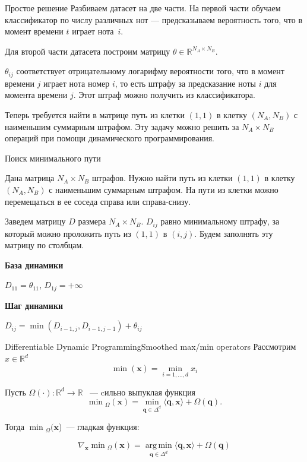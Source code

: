 \documentclass[unicode, dvipsnames]{beamer}
\DeclareMathOperator*{\argmin}{arg\,min}
\begin{document}
\begin{frame}{Простое решение}
	Разбиваем датасет на две части.
	На первой части обучаем классификатор по числу различных нот --- предсказываем вероятность того, что в момент времени $t$ играет нота~$i$.
	
	\bigskip
	Для второй части датасета построим матрицу $\theta \in \mathds{R}^{N_A \times N_B}$. 
	
	$\theta_{ij}$ соответствует отрицательному логарифму вероятности того, что в момент времени $j$ играет нота номер $i$, то есть штрафу за предсказание ноты $i$ для момента времени $j$. Этот штраф можно получить из классификатора.
	
	\bigskip
	Теперь требуется найти в матрице путь из клетки $(1, 1)$ в клетку $(N_A, N_B)$ с наименьшим суммарным штрафом. Эту задачу можно решить за $N_A \times N_B$ операций при помощи динамического программирования.
	
\end{frame}

\begin{frame}{Поиск минимального пути}

Дана матрица $N_A \times N_B$ штрафов. Нужно найти путь из клетки $(1, 1)$ в клетку $(N_A, N_B)$ с наименьшим суммарным штрафом. На пути из клетки можно перемещаться в ее соседа справа или справа-снизу.

\bigskip
Заведем матрицу $D$ размера $N_A \times N_B$. $D_{ij}$ равно минимальному штрафу, за который можно проложить путь из $(1, 1)$ в $(i, j)$. Будем заполнять эту матрицу по столбцам.

\bigskip
\textbf{База динамики}

$D_{11} = \theta_{11}$, $D_{1j} = +\infty$

\bigskip
\textbf{Шаг динамики}

$D_{ij} = \min(D_{i-1, j}, D_{i-1, j-1}) + \theta_{ij}$

\end{frame}

\begin{frame}{Differentiable Dynamic Programming}{Smoothed max/min operators}
Рассмотрим $x \in \mathbb{R}^d$
\[
	\min(\bm{x}) = \min\limits_{i=1,\ldots,d} x_i
\]	

Пусть $\Omega(\cdot): \mathbb{R}^d \to \mathbb{R}$ ~--- cильно выпуклая функция
\[
	\min{}_{\Omega}(\bm{x}) = \min\limits_{\bm{q} \in \Delta^d} \langle \bm{q}, \bm{x}\rangle + \Omega(\bm{q}).
\]

Тогда $\min{}_{\Omega}(\bm{x}$)~--- гладкая функция:

\[
	\nabla_{\bm{x}} \min{}_{\Omega}(\bm{x}) = \argmin\limits_{\bm{q} \in \Delta^d} \langle \bm{q}, \bm{x}\rangle + \Omega(\bm{q})
\]
\end{frame}
\end{document}
